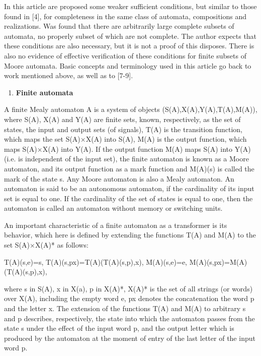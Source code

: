 \documentclass{article}
\begin{document}
In this article are proposed some weaker sufficient conditions, but similar to those found in [4], for completeness in the same class of automata, compositions and realizations. Was found that there are arbitrarily large complete subsets of automata, no properly subset of which are not complete. The author expects that these conditions are also necessary, but it is not a proof of this disposes. There is also no evidence of effective verification of these conditions for finite subsets of Moore automata. Basic concepts and terminology used in this article go back to work mentioned above, as well as to [7-9].

\begin{enumerate}
\item  \textbf{Finite automata}
\end{enumerate}

A finite Mealy automaton A is a system of objects (S(A),X(A),Y(A),T(A),M(A)), where S(A), X(A) and Y(A) are finite sets, known, respectively, as the set of states, the input and output sets (of signals), T(A) is the transition function, which maps the set S(A)$\times$X(A) into S(A), M(A) is the output function, which maps S(A)$\times$X(A) into Y(A). If the output function M(A) maps S(A) into Y(A) (i.e. is independent of the input set), the finite automaton is known as a Moore automaton, and its output function as a mark function and M(A)(s) is called the mark of the state s. Any Moore automaton is also a Mealy automaton. An automaton is said to be an autonomous automaton, if the cardinality of its input set is equal to one. If the cardinality of the set of states is equal to one, then the automaton is called an automaton without memory or switching units.

An important characteristic of a finite automaton as a transformer is its behavior, which here is defined by extending the functions T(A) and M(A) to the set S(A)$\times$X(A)* as follows:

T(A)(s,e)=s, T(A)(s,px)=T(A)(T(A)(s,p),x), M(A)(s,e)=e, M(A)(s,px)=M(A)(T(A)(s,p),x),

where s in S(A), x in X(a),  p in X(A)*, X(A)* is the set of all strings (or words) over X(A), including the empty word e, px denotes the concatenation the word p and the letter x. The extension of the functions T(A) and M(A) to arbitrary s and p describes, respectively, the state into which the automaton passes from the state s under the effect of the input word p, and the output letter which is produced by the automaton at the moment of entry of the last letter of the input word p.
\end{document}
